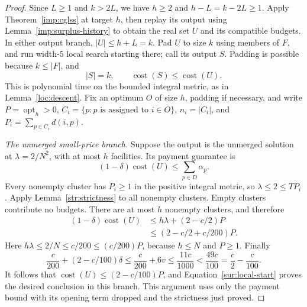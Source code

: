 \begin{proof}
Since $L\ge1$ and $k>2L$, we have $h\ge2$ and $h-L=k-2L\ge1$.
Apply Theorem~\ref{imp:cglss} at target $h$, then replay its output
using Lemma~\ref{imp:surplus-history} to obtain the real set $U$ and
its compatible budgets. In either output branch, $|U|\le h+L=k$.
Pad $U$ to size $k$ using members of $F$, and run width-$5$ local
search starting there; call its output $S$.  Padding is possible because
$k\le|F|$, and
\begin{equation}\label{sur:local-start}
 |S|=k,\qquad \operatorname{cost}(S)\le\operatorname{cost}(U).
\end{equation}
This is polynomial time on the bounded integral metric, as in
Lemma~\ref{loc:descent}.  Fix an optimum $O$ of size $h$, padding if
necessary, and write $P=\operatorname{opt}_h>0$,
$C_i=\{p:p\text{ is assigned to }i\in O\}$,
$n_i=|C_i|$, and $P_i=\sum_{p\in C_i}d(i,p)$.

\textit{The unmerged small-price branch.}
Suppose the output is the unmerged solution at
$\lambda=2/N^2$, with at most $h$ facilities.  Its payment guarantee is
\[
 (1-\delta)\operatorname{cost}(U)\le\sum_{p\in D}\alpha_p.
\]
Every nonempty cluster has $P_i\ge1$ in the positive integral metric,
so $\lambda\le2\le TP_i$.  Apply Lemma~\ref{str:strictness} to all
nonempty clusters.  Empty clusters contribute no budgets.  There are
at most $h$ nonempty clusters, and therefore
\begin{align*}
 (1-\delta)\operatorname{cost}(U)
 &\le h\lambda+(2-c/2)P\\
 &\le\left(2-c/2+c/200\right)P.
\end{align*}
Here $h\lambda\le2/N\le c/200\le(c/200)P$, because $h\le N$ and
$P\ge1$.  Finally
\[
 \frac{c}{200}+(2-c/100)\delta
 \le\frac{c}{200}+6v
 \le\frac{11c}{1000}<\frac{49c}{100}
 =\frac c2-\frac c{100}.
\]
It follows that $\operatorname{cost}(U)\le(2-c/100)P$, and
Equation~\eqref{sur:local-start} proves the desired conclusion in this
branch.  This argument uses only the payment bound with its opening
term dropped and the strictness just proved.


\end{proof}
